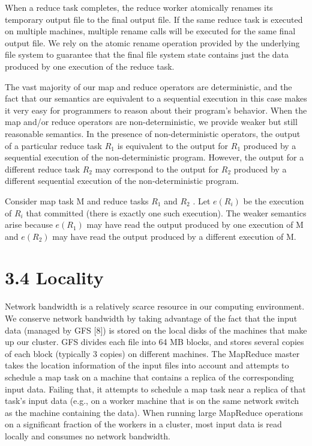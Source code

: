 \documentclass[
]{article}
\begin{document}
When a reduce task completes, the reduce worker atomically renames its
temporary output file to the final output file. If the same reduce task
is executed on multiple machines, multiple rename calls will be executed
for the same final output file. We rely on the atomic rename operation
provided by the underlying file system to guarantee that the final file
system state contains just the data produced by one execution of the
reduce task.

The vast majority of our map and reduce operators are deterministic, and
the fact that our semantics are equivalent to a sequential execution in
this case makes it very easy for programmers to reason about their
program's behavior. When the map and/or reduce operators are
non-deterministic, we provide weaker but still reasonable semantics. In
the presence of non-deterministic operators, the output of a particular
reduce task \(R_{1}\) is equivalent to the output for \(R_{1}\) produced
by a sequential execution of the non-deterministic program. However, the
output for a different reduce task \(R_{2}\) may correspond to the
output for \(R_{2}\) produced by a different sequential execution of the
non-deterministic program.

Consider map task M and reduce tasks \(R_{1}\) and \(R_{2}\) . Let
\(e(R_{i})\) be the execution of \(R_{i}\) that committed (there is
exactly one such execution). The weaker semantics arise because
\(e(R_{1})\) may have read the output produced by one execution of M and
\(e(R_{2})\) may have read the output produced by a different execution
of M.

\section{3.4 Locality}\label{locality}

Network bandwidth is a relatively scarce resource in our computing
environment. We conserve network bandwidth by taking advantage of the
fact that the input data (managed by GFS {[}8{]}) is stored on the local
disks of the machines that make up our cluster. GFS divides each file
into 64 MB blocks, and stores several copies of each block (typically 3
copies) on different machines. The MapReduce master takes the location
information of the input files into account and attempts to schedule a
map task on a machine that contains a replica of the corresponding input
data. Failing that, it attempts to schedule a map task near a replica of
that task's input data (e.g., on a worker machine that is on the same
network switch as the machine containing the data). When running large
MapReduce operations on a significant fraction of the workers in a
cluster, most input data is read locally and consumes no network
bandwidth.
\end{document}
